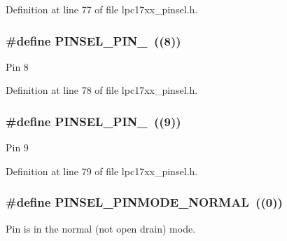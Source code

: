 Definition at line 77 of file lpc17xx\+\_\+pinsel.\+h.

\subsubsection[{\texorpdfstring{P\+I\+N\+S\+E\+L\+\_\+\+P\+I\+N\+\_\+8}{PINSEL_PIN_8}}]{\setlength{\rightskip}{0pt plus 5cm}\#define P\+I\+N\+S\+E\+L\+\_\+\+P\+I\+N\+\_~((8))}\hypertarget{group___p_i_n_s_e_l___public___macros_gac8ba0c15c6f09a073231c8819f5d5815}{}\label{group___p_i_n_s_e_l___public___macros_gac8ba0c15c6f09a073231c8819f5d5815}
Pin 8 

Definition at line 78 of file lpc17xx\+\_\+pinsel.\+h.

\subsubsection[{\texorpdfstring{P\+I\+N\+S\+E\+L\+\_\+\+P\+I\+N\+\_\+9}{PINSEL_PIN_9}}]{\setlength{\rightskip}{0pt plus 5cm}\#define P\+I\+N\+S\+E\+L\+\_\+\+P\+I\+N\+\_~((9))}\hypertarget{group___p_i_n_s_e_l___public___macros_ga7c6bcb2cc66e084d83758723ba42a9b8}{}\label{group___p_i_n_s_e_l___public___macros_ga7c6bcb2cc66e084d83758723ba42a9b8}
Pin 9 

Definition at line 79 of file lpc17xx\+\_\+pinsel.\+h.

\subsubsection[{\texorpdfstring{P\+I\+N\+S\+E\+L\+\_\+\+P\+I\+N\+M\+O\+D\+E\+\_\+\+N\+O\+R\+M\+AL}{PINSEL_PINMODE_NORMAL}}]{\setlength{\rightskip}{0pt plus 5cm}\#define P\+I\+N\+S\+E\+L\+\_\+\+P\+I\+N\+M\+O\+D\+E\+\_\+\+N\+O\+R\+M\+AL~((0))}\hypertarget{group___p_i_n_s_e_l___public___macros_ga699b7086c454cbc6e279f7f7c7d25ee6}{}\label{group___p_i_n_s_e_l___public___macros_ga699b7086c454cbc6e279f7f7c7d25ee6}
Pin is in the normal (not open drain) mode. 

